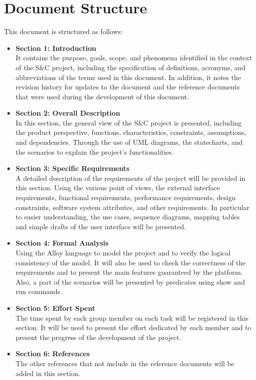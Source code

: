 \section{Document Structure}\label{sec:structure}
This document is structured as follows:
\begin{itemize}
    \item \textbf{Section 1: Introduction} 
    \\It contains the purpose, goals, scope, and phenomena identified in the context of the S\&C project, 
    including the specification of definitions, acronyms, and abbreviations of the terms used in this document. In addition, it notes the revision 
    history for updates to the document and the reference documents that were used during the development of this document.
    \item \textbf{Section 2: Overall Description}
    \\ In this section, the general view of the S\&C project is presented, including the product perspective, functions, characteristics, 
    constraints, assumptions, and dependencies. Through the use of UML diagrams, the statecharts, and the scenarios to explain the project's 
    functionalities.
    \item \textbf{Section 3: Specific Requirements}
    \\ A detailed description of the requirements of the project will be provided in this section. Using the various point of views, the external   
    interface requirements, functional requirements, performance requirements, design constraints, software system attributes, and other 
    requirements. In particular to easier understanding, the use cases, sequence diagrams, mapping tables and simple drafts of the user interface 
    will be presented.
    \item \textbf{Section 4: Formal Analysis}
    \\ Using the Alloy language to model the project and to verify the logical consistency of the model. It will also be used to check the
    correctness of the requirements and to present the main features guaranteed by the platform. Also, a part of the scenarios will be presented 
    by predicates using show and run commands.
    \item \textbf{Section 5: Effort Spent}
    \\The time spent by each group member on each task will be registered in this section. It will be used to present the effort dedicated 
    by each member and to present the progress of the development of the project.
    \item \textbf{Section 6: References}
    \\ The other references that not include in the reference documents will be added in this section.
\end{itemize}